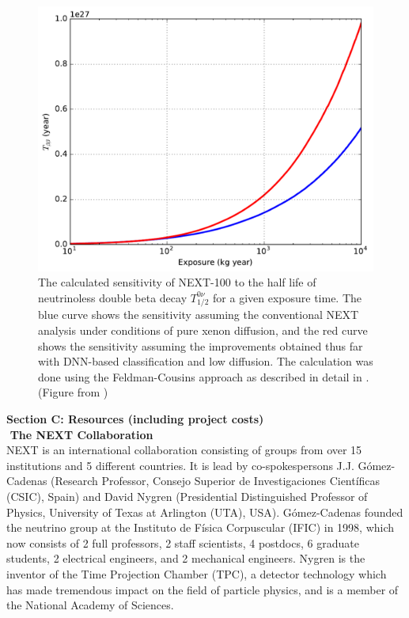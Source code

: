 \documentclass[11pt,a4paper]{article}
\begin{document}
\begin{figure}[!htb]
	\centering
	\includegraphics[scale=0.6]{fig/half_life_sensitivity.pdf}
	\caption{\label{fig.halflife}The calculated sensitivity of NEXT-100 to the half life of neutrinoless double beta decay $T^{0\nu}_{1/2}$ for a given exposure time. The blue curve shows the sensitivity assuming the conventional NEXT analysis under conditions of pure xenon diffusion, and the red curve shows the sensitivity assuming the improvements obtained thus far with DNN-based classification and low diffusion. The calculation was done using the Feldman-Cousins approach \cite{Feldman_1998} as described in detail in \cite{NEXT_sensitivity}. (Figure from \cite{NEXT_DNN})}
\end{figure}

{\noindent\textbf{Section C: Resources (including project costs)}}\\

\noindent\textbf{\textbullet\,\,The NEXT Collaboration}\\
NEXT is an international collaboration consisting of groups from over 15 institutions and 5 different countries. It is lead by co-spokespersons J.J. G\'{o}mez-Cadenas (Research Professor, Consejo Superior de Investigaciones Cient\'{i}ficas (CSIC), Spain) and David Nygren (Presidential Distinguished Professor of Physics, University of Texas at Arlington (UTA), USA). G\'{o}mez-Cadenas founded the neutrino group at the Instituto de F\'{i}sica Corpuscular (IFIC) in 1998, which now consists of 2 full professors, 2 staff scientists, 4 postdocs, 6 graduate students, 2 electrical engineers, and 2 mechanical engineers. Nygren is the inventor of the Time Projection Chamber (TPC), a detector technology which has made tremendous impact on the field of particle physics, and is a member of the National Academy of Sciences.
\end{document}
